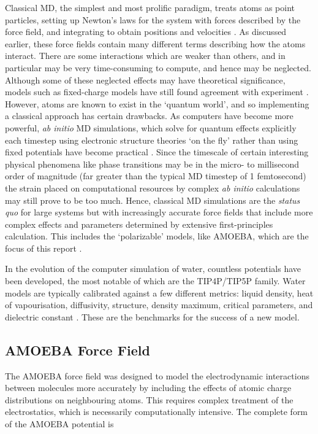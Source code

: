 \par
Classical MD, the simplest and most prolific paradigm, treats atoms as point particles, setting up Newton's laws 
for the system with forces described by the force field, and integrating to obtain positions and velocities 
\cite{vollmers2025}.
As discussed earlier, these force fields contain many different terms describing how the atoms interact.
There are some interactions which are weaker than others, and in particular may be very time-consuming to compute,
and hence may be neglected.
Although some of these neglected effects may have theoretical significance, models such as fixed-charge models
have still found agreement with experiment \cite{guillot2002}.
However, atoms are known to exist in the `quantum world', and so implementing a classical approach
has certain drawbacks.
As computers have become more powerful, \textit{ab initio} MD simulations, which solve for quantum effects explicitly 
each timestep using electronic structure theories `on the fly' rather than using fixed potentials have become practical
\cite{iftimie2005}.
Since the timescale of certain interesting physical phenomena like phase transitions may be in the micro- to millisecond
order of magnitude (far greater than the typical MD timestep of 1 femtosecond) the strain placed on computational 
resources by complex \textit{ab initio} calculations may still prove to be too much.
Hence, classical MD simulations are the \textit{status quo} for large systems but with increasingly accurate 
force fields that include more complex effects and parameters determined by extensive first-principles calculation. 
This includes the `polarizable' models, like AMOEBA, which are the focus of this report \cite{halgren2001,finney2001}.

\par
In the evolution of the computer simulation of water, countless potentials have been developed,
the most notable of which are the TIP4P/TIP5P family.
Water models are typically calibrated against a few different metrics: liquid density, heat of vapourisation,
diffusivity, structure, density maximum, critical parameters, and dielectric constant \cite{guillot2002}.
These are the benchmarks for the success of a new model.

\subsection{AMOEBA Force Field}
The AMOEBA force field was designed to model the electrodynamic interactions between molecules
more accurately by including the effects of atomic charge distributions on neighbouring atoms.
This requires complex treatment of the electrostatics, which is necessarily computationally intensive.
The complete form of the AMOEBA potential is

